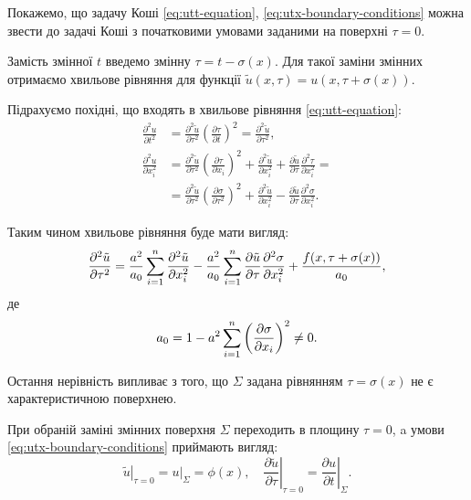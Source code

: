 Покажемо, що задачу Коші \eqref{eq:utt-equation}, \eqref{eq:utx-boundary-conditions} можна звести до задачі Коші з початковими умовами заданими на поверхні $\tau = 0$. \medskip

Замість змінної $t$ введемо змінну $\tau = t - \sigma(x)$. Для такої заміни змінних отримаємо хвильове рівняння для функції $\tilde u(x, \tau) = u(x, \tau + \sigma(x))$. \medskip

Підрахуємо похідні, що входять в хвильове рівняння \eqref{eq:utt-equation}:
\begin{align}
    \frac{\partial^2 u}{\partial t^2} &= \frac{\partial^2 \tilde u}{\partial \tau^2} \left( \frac{\partial \tau}{\partial t} \right)^2 =  \frac{\partial^2 \tilde u}{\partial \tau^2}, \\
    \frac{\partial^2 u}{\partial x_i^2} &= \frac{\partial^2 \tilde u}{\partial \tau^2} \left( \frac{\partial \tau}{\partial x_i} \right)^2 + \frac{\partial^2 \tilde u}{\partial x_i^2} + \frac{\partial \tilde u}{\partial \tau} \frac{\partial^2 \tau}{\partial x_i^2} = \\
    &= \frac{\partial^2 \tilde u}{\partial \tau^2} \left( \frac{\partial \sigma}{\partial \tau^2} \right)^2 + \frac{\partial^2 \tilde u}{\partial x_i^2} - \frac{\partial \tilde u}{\partial \tau} \frac{\partial^2 \sigma}{\partial x_i^2}. \nonumber
\end{align}

Таким чином хвильове рівняння буде мати вигляд:
\begin{equation}
    \label{eq:tilde-u-wwave-equation}
    \frac{\partial^2 \tilde u}{\partial \tau^2} = \frac{a^2}{a_0} \displaystyle\sum\limits_{i = 1}^n \frac{\partial^2 \tilde u}{\partial x_i^2} - \frac{a^2}{a_0} \displaystyle\sum\limits_{i = 1}^n \frac{\partial \tilde u}{\partial \tau} \frac{\partial^2 \sigma}{\partial x_i^2} + \frac{f(x, \tau + \sigma(x))}{a_0},
\end{equation}
де
\begin{equation}
    a_0 = 1 - a^2 \displaystyle\sum\limits_{i = 1}^n \left( \frac{\partial \sigma}{\partial x_i} \right)^2 \ne 0.
\end{equation}

Остання нерівність випливає з того, що $\Sigma$ задана рівнянням $\tau = \sigma(x)$ не є характеристичною поверхнею. \medskip

При обраній заміні змінних поверхня $\Sigma$ переходить в площину $\tau = 0$, a умови \eqref{eq:utx-boundary-conditions} приймають вигляд:
\begin{equation}
    \label{eq:tilde-u-boundary-conditions}
    \left. \tilde u \right|_{\tau = 0} = \left. u \right|_\Sigma = \phi(x), \quad \left. \frac{\partial \tilde u}{\partial \tau} \right|_{\tau = 0} = \left. \frac{\partial u}{\partial t} \right|_\Sigma.
\end{equation}

